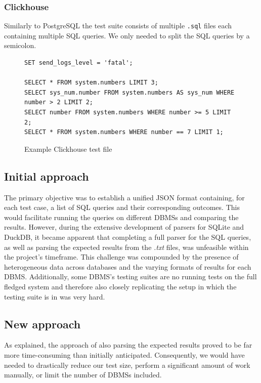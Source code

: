 \documentclass[acmsmall,nonacm]{acmart}
\begin{document}
\subsubsection*{Clickhouse}
Similarly to PostgreSQL the test suite consists of multiple \texttt{.sql} files each containing multiple SQL queries. We only needed to split the SQL queries by a semicolon.
\begin{figure}[h!]
\vspace{-0.2cm}
\begin{verbatim}
SET send_logs_level = 'fatal';

SELECT * FROM system.numbers LIMIT 3;
SELECT sys_num.number FROM system.numbers AS sys_num WHERE number > 2 LIMIT 2;
SELECT number FROM system.numbers WHERE number >= 5 LIMIT 2;
SELECT * FROM system.numbers WHERE number == 7 LIMIT 1;
\end{verbatim}
\vspace{-0.3cm}
\caption{Example Clickhouse test file}
\label{fig:clickhouse-test}
\vspace{-0.3cm}
\end{figure}

\subsection{Initial approach}

The primary objective was to establish a unified JSON format containing, for each test case, a list of SQL queries and their corresponding outcomes. This would facilitate running the queries on different DBMSs and comparing the results. However, during the extensive development of parsers for SQLite and DuckDB, it became apparent that completing a full parser for the SQL queries, as well as parsing the expected results from the \textit{.txt} files, was unfeasible within the project’s timeframe. This challenge was compounded by the presence of heterogeneous data across databases and the varying formats of results for each DBMS. Additionally, some DBMS's testing suites are no running tests on the full fledged system and therefore also closely replicating the setup in which the testing suite is in was very hard. 


\subsection{New approach}
As explained, the approach of also parsing the expected results proved to be far more time-consuming than initially anticipated. Consequently, we would have needed to drastically reduce our test size, perform a significant amount of work manually, or limit the number of DBMSs included.
\end{document}
